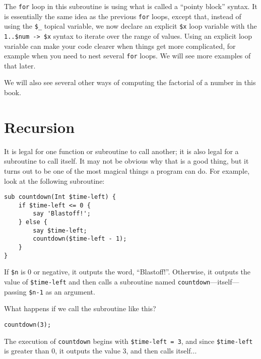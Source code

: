 The {\tt for} loop in this subroutine is using what is called 
a ``pointy block'' syntax. It is essentially the same idea 
as the previous {\tt for} loops, except that, 
instead of using the \verb"$_" topical variable, we 
now declare an explicit \verb"$x" loop variable with the 
\verb"1..$num -> $x" syntax to iterate over the range 
of values. Using an explicit loop variable can make your 
code clearer when things get more complicated, for example 
when you need to nest several {\tt for} loops. We will 
see more examples of that later.

We will also see several other ways of computing the factorial 
of a number in this book.

\section{Recursion}
\label{recursion}

It is legal for one function or subroutine to call another;
it is also legal for a subroutine to call itself.  It may not 
be obvious why that is a good thing, but it turns out to be 
one of the most magical things a program can do. 
For example, look at the following subroutine:

\begin{verbatim}
sub countdown(Int $time-left) {
    if $time-left <= 0 {
        say 'Blastoff!';
    } else {
        say $time-left;
        countdown($time-left - 1);
    }
}
\end{verbatim}
%
If {\tt \$n} is 0 or negative, it outputs the word, 
``Blastoff!''. Otherwise, it outputs the value of 
{\tt \$time-left} and then calls a subroutine named 
{\tt countdown}---itself---passing {\tt \$n-1} as an argument.

What happens if we call the subroutine like this?

\begin{verbatim}
countdown(3);
\end{verbatim}
%
The execution of {\tt countdown} begins with {\tt \$time-left 
= 3}, and since {\tt \$time-left} is greater than 0, it 
outputs the value 3, and then calls itself...

